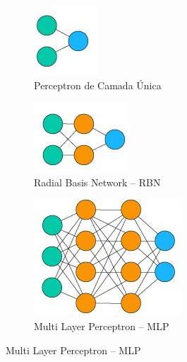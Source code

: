 \begin{figure}[!ht]
	\begin{subfigure}[h]{0.15\linewidth}
		\caption{Perceptron de Camada Única}
		\label{fig:slp}
		\centering
		\includegraphics[width=0.6\linewidth]{img/pop_arch/single_layer_perceptron.jpg}
	\end{subfigure}
	\hspace{0.1cm}
	\begin{subfigure}[h]{0.15\linewidth}
		\caption{Radial Basis Network -- RBN}
		\label{fig:rbm}
		\centering
		\includegraphics[width=0.9\linewidth]{img/pop_arch/radial_basis_network.jpg}
	\end{subfigure}
	\hspace{0.1cm}
	\begin{subfigure}[h]{0.3\linewidth}
		\caption{Multi Layer Perceptron -- MLP}
		\label{fig:mlp}
		\centering
		\includegraphics[width=0.75\linewidth]{img/pop_arch/mlp.jpg}

\end{subfigure}
\end{figure}
